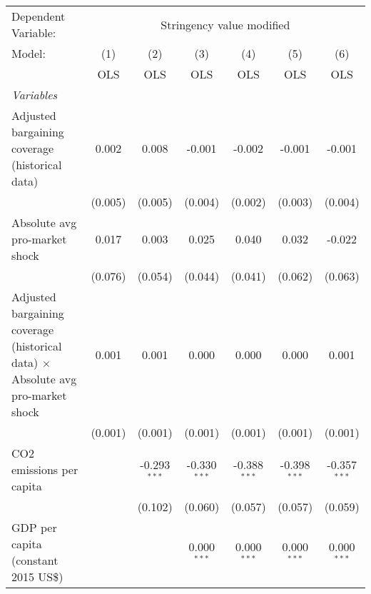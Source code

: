 
\begingroup
\centering
\begin{tabular}{lcccccc}
   \toprule
   Dependent Variable: & \multicolumn{6}{c}{Stringency value modified}\\
   Model:                                                                                 & (1)     & (2)            & (3)            & (4)            & (5)            & (6)\\  
                                                                                          &  OLS    & OLS            & OLS            & OLS            & OLS            & OLS\\  
   \midrule
   \emph{Variables}\\
   Adjusted bargaining coverage (historical data)                                         & 0.002   & 0.008          & -0.001         & -0.002         & -0.001         & -0.001\\   
                                                                                          & (0.005) & (0.005)        & (0.004)        & (0.002)        & (0.003)        & (0.004)\\   
   Absolute avg pro-market shock                                                          & 0.017   & 0.003          & 0.025          & 0.040          & 0.032          & -0.022\\   
                                                                                          & (0.076) & (0.054)        & (0.044)        & (0.041)        & (0.062)        & (0.063)\\   
   Adjusted bargaining coverage (historical data) $\times$ Absolute avg pro-market shock  & 0.001   & 0.001          & 0.000          & 0.000          & 0.000          & 0.001\\   
                                                                                          & (0.001) & (0.001)        & (0.001)        & (0.001)        & (0.001)        & (0.001)\\   
   CO2 emissions per capita                                                               &         & -0.293$^{***}$ & -0.330$^{***}$ & -0.388$^{***}$ & -0.398$^{***}$ & -0.357$^{***}$\\   
                                                                                          &         & (0.102)        & (0.060)        & (0.057)        & (0.057)        & (0.059)\\   
   GDP per capita (constant 2015 US\$)                                                    &         &                & 0.000$^{***}$  & 0.000$^{***}$  & 0.000$^{***}$  & 0.000$^{***}$\\   

\end{tabular}
